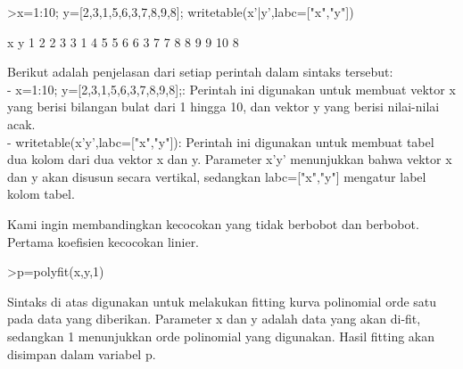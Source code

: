 \documentclass[a4paper,10pt]{article}
\begin{document}
\begin{eulernotebook}
\begin{eulercomment}
\begin{eulercomment}
\begin{eulercomment}
\begin{eulercomment}
\begin{eulercomment}
\begin{eulercomment}
\begin{eulercomment}
\begin{eulercomment}
\begin{eulercomment}
\begin{eulercomment}
\begin{eulercomment}
\begin{eulercomment}
\begin{eulercomment}
\begin{eulercomment}
\begin{eulercomment}
\begin{eulercomment}
\begin{eulercomment}
\begin{eulercomment}
\begin{eulercomment}
\end{eulercomment}
\begin{eulerprompt}
>x=1:10; y=[2,3,1,5,6,3,7,8,9,8]; writetable(x'|y',labc=["x","y"])
\end{eulerprompt}
\begin{euleroutput}
           x         y
           1         2
           2         3
           3         1
           4         5
           5         6
           6         3
           7         7
           8         8
           9         9
          10         8
\end{euleroutput}
\begin{eulercomment}
Berikut adalah penjelasan dari setiap perintah dalam sintaks tersebut:\\
- x=1:10; y=[2,3,1,5,6,3,7,8,9,8];: Perintah ini digunakan untuk
membuat vektor x yang berisi bilangan bulat dari 1 hingga 10, dan
vektor y yang berisi nilai-nilai acak.\\
- writetable(x'\textbar{}y',labc=["x","y"]): Perintah ini digunakan untuk
membuat tabel dua kolom dari dua vektor x dan y. Parameter x'\textbar{}y'
menunjukkan bahwa vektor x dan y akan disusun secara vertikal,
sedangkan labc=["x","y"] mengatur label kolom tabel.

Kami ingin membandingkan kecocokan yang tidak berbobot dan berbobot.
Pertama koefisien kecocokan linier.
\end{eulercomment}
\begin{eulerprompt}
>p=polyfit(x,y,1)
\end{eulerprompt}
\begin{euleroutput}
  [0.733333,  0.812121]
\end{euleroutput}
\begin{eulercomment}
Sintaks di atas digunakan untuk melakukan fitting kurva polinomial
orde satu pada data yang diberikan. Parameter x dan y adalah data yang
akan di-fit, sedangkan 1 menunjukkan orde polinomial yang digunakan.
Hasil fitting akan disimpan dalam variabel p.


\end{eulercomment}
\end{eulercomment}
\end{eulercomment}
\end{eulercomment}
\end{eulercomment}
\end{eulercomment}
\end{eulercomment}
\end{eulercomment}
\end{eulercomment}
\end{eulercomment}
\end{eulercomment}
\end{eulercomment}
\end{eulercomment}
\end{eulercomment}
\end{eulercomment}
\end{eulercomment}
\end{eulercomment}
\end{eulercomment}
\end{eulercomment}
\end{eulernotebook}
\end{document}
